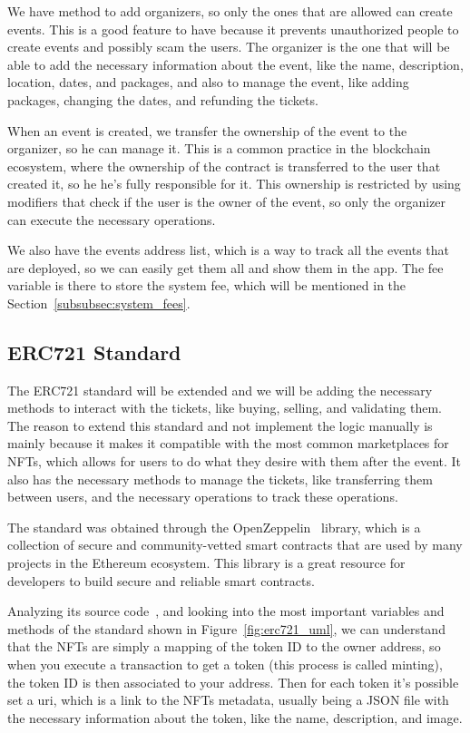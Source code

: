 We have method to add organizers, so only the ones that are allowed can create
events. This is a good feature to have because it prevents unauthorized people
to create events and possibly scam the users. The organizer is the one that
will be able to add the necessary information about the event, like the name,
description, location, dates, and packages, and also to manage the event, like
adding packages, changing the dates, and refunding the tickets.

When an event is created, we transfer the ownership of the event to the
organizer, so he can manage it. This is a common practice in the blockchain
ecosystem, where the ownership of the contract is transferred to the user that
created it, so he he's fully responsible for it. This ownership is restricted
by using modifiers that check if the user is the owner of the event, so only
the organizer can execute the necessary operations.

We also have the events address list, which is a way to track all the events
that are deployed, so we can easily get them all and show them in the app. The
fee variable is there to store the system fee, which will be mentioned in the
Section~\ref{subsubsec:system_fees}.

\subsection{ERC721 Standard}\label{subsec:erc721_standard}

The ERC721 standard will be extended and we will be adding the necessary
methods to interact with the tickets, like buying, selling, and validating
them. The reason to extend this standard and not implement the logic manually
is mainly because it makes it compatible with the most common marketplaces for
NFTs, which allows for users to do what they desire with them after the event.
It also has the necessary methods to manage the tickets, like transferring them
between users, and the necessary operations to track these operations.

The standard was obtained through the OpenZeppelin~\cite{openzeppelin} library,
which is a collection of secure and community-vetted smart contracts that are
used by many projects in the Ethereum ecosystem. This library is a great
resource for developers to build secure and reliable smart contracts.

Analyzing its source code~\cite{erc721_github}, and looking into the most
important variables and methods of the standard shown in
Figure~\ref{fig:erc721_uml}, we can understand that the NFTs are simply a
mapping of the token ID to the owner address, so when you execute a transaction
to get a token (this process is called minting), the token ID is then
associated to your address. Then for each token it's possible set a \gls{uri},
which is a link to the NFTs metadata, usually being a JSON file with the
necessary information about the token, like the name, description, and image.

